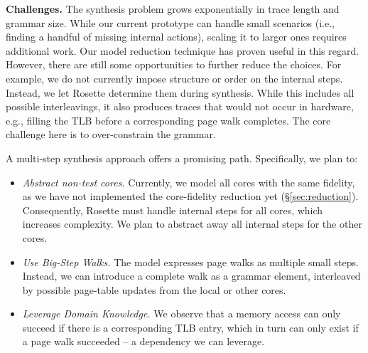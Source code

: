 \noindent\textbf{Challenges.}
The synthesis problem grows exponentially in trace length and grammar size.
While our current prototype can handle small scenarios (i.e., finding a handful of missing internal actions), scaling it to larger ones requires additional work. 
Our model reduction technique has proven useful in this regard. 
However, there are still some opportunities to further reduce the choices.
For example, we do not currently impose structure or order on the internal steps. Instead, we let Rosette determine them during synthesis. While this includes all possible interleavings, it also produces traces that would not occur in hardware, e.g., filling the TLB before a corresponding page walk completes. The core challenge here is to over-constrain the grammar.

A multi-step synthesis approach offers a promising path. Specifically, we plan to:

\begin{itemize}[topsep=0pt, leftmargin=1.5em]
  \item \emph{Abstract non-test cores.} Currently, we model all cores with the same fidelity, as we have not implemented the core-fidelity reduction yet (\S\ref{sec:reduction}).
  Consequently, Rosette must handle internal steps for all cores, which increases complexity.
  We plan to abstract away all internal steps for the other cores. 
  \item \emph{Use Big-Step Walks.} The model expresses page walks as multiple small steps. Instead, we can introduce a complete walk as a grammar element, interleaved by possible page-table updates from the local or other cores.
  \item \emph{Leverage Domain Knowledge.} We observe that a memory access can only succeed if there is a corresponding TLB entry, which in turn can only exist if a page walk succeeded -- a dependency we can leverage. 
\end{itemize}
